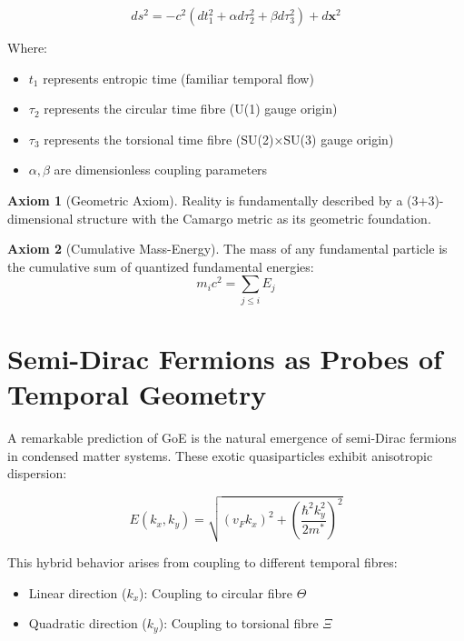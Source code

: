 \documentclass[12pt,a4paper]{article}
\theoremstyle{definition}
\newtheorem{axiom}{Axiom}
\begin{document}
\begin{equation}
\boxed{ds^2 = -c^2(dt_1^2 + \alpha d\tau_2^2 + \beta d\tau_3^2) + d\mathbf{x}^2}
\label{eq:camargo_metric}
\end{equation}

Where:
\begin{itemize}
\item $t_1$ represents entropic time (familiar temporal flow)
\item $\tau_2$ represents the circular time fibre (U(1) gauge origin)
\item $\tau_3$ represents the torsional time fibre (SU(2)×SU(3) gauge origin)
\item $\alpha, \beta$ are dimensionless coupling parameters
\end{itemize}

\begin{axiom}[Geometric Axiom]
Reality is fundamentally described by a (3+3)-dimensional structure with the Camargo metric as its geometric foundation.
\end{axiom}

\begin{axiom}[Cumulative Mass-Energy]
The mass of any fundamental particle is the cumulative sum of quantized fundamental energies:
\begin{equation}
m_i c^2 = \sum_{j \leq i} E_j
\label{eq:cumulative_axiom}
\end{equation}
\end{axiom}

\section{Semi-Dirac Fermions as Probes of Temporal Geometry}

A remarkable prediction of GoE is the natural emergence of semi-Dirac fermions in condensed matter systems. These exotic quasiparticles exhibit anisotropic dispersion:

\begin{equation}
E(k_x, k_y) = \sqrt{(v_F k_x)^2 + \left(\frac{\hbar^2 k_y^2}{2m^*}\right)^2}
\label{eq:semi_dirac_dispersion}
\end{equation}

This hybrid behavior arises from coupling to different temporal fibres:
\begin{itemize}
\item Linear direction ($k_x$): Coupling to circular fibre $\Theta$
\item Quadratic direction ($k_y$): Coupling to torsional fibre $\Xi$
\end{itemize}
\end{document}
